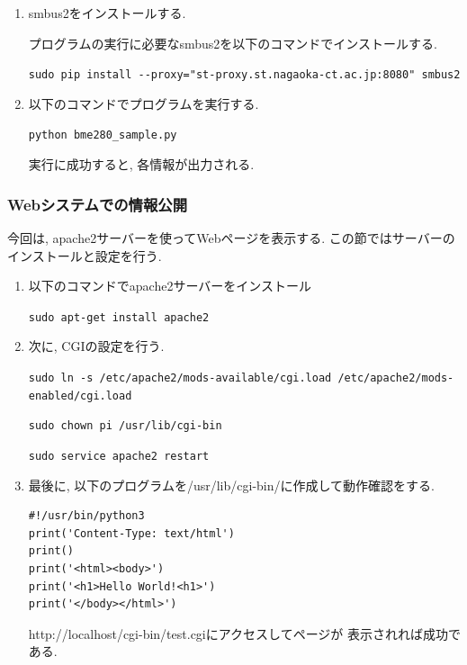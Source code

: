 \documentclass[titlepage]{jsarticle}
\begin{document}
\begin{enumerate}
                \item smbus2をインストールする.
                    
                    プログラムの実行に必要なsmbus2を以下のコマンドでインストールする.

                    \verb|sudo pip install --proxy="st-proxy.st.nagaoka-ct.ac.jp:8080" smbus2|

                \item 以下のコマンドでプログラムを実行する.
                
                    \verb|python bme280_sample.py|

                    実行に成功すると, 各情報が出力される.

            \end{enumerate}

        \subsubsection{Webシステムでの情報公開}
            今回は, apache2サーバーを使ってWebページを表示する.
            この節ではサーバーのインストールと設定を行う.

            \begin{enumerate}
                \item 以下のコマンドでapache2サーバーをインストール

                    \verb|sudo apt-get install apache2|

                \item 次に, CGIの設定を行う.
                
                    \verb|sudo ln -s /etc/apache2/mods-available/cgi.load /etc/apache2/mods-enabled/cgi.load|
                    
                    \verb|sudo chown pi /usr/lib/cgi-bin|

                    \verb|sudo service apache2 restart|

                \item 最後に, 以下のプログラムを/usr/lib/cgi-bin/に作成して動作確認をする.

                    \begin{lstlisting}[caption=test.cgi]
#!/usr/bin/python3
print('Content-Type: text/html')
print()
print('<html><body>')
print('<h1>Hello World!<h1>')
print('</body></html>')
                    \end{lstlisting}

                    http://localhost/cgi-bin/test.cgiにアクセスしてページが
                    表示されれば成功である.

            \end{enumerate}
\end{document}

